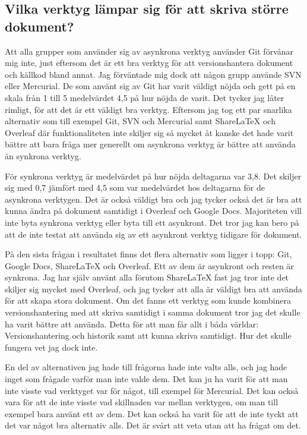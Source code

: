\subsection{Vilka verktyg lämpar sig för att skriva större dokument?}
Att alla grupper som använder sig av asynkrona verktyg använder Git förvånar mig inte, just eftersom det är ett bra verktyg för att versionshantera dokument och källkod bland annat. Jag förväntade mig dock att någon grupp använde SVN eller Mercurial. De som använt sig av Git har varit väldigt nöjda och gett på en skala från 1 till 5 medelvärdet 4,5 på hur nöjda de varit. Det tycker jag låter rimligt, för att det är ett väldigt bra verktyg. Eftersom jag tog ett par snarlika alternativ som till exempel Git, SVN och Mercurial samt ShareLaTeX och Overleaf där funktionaliteten inte skiljer sig så mycket åt kanske det hade varit bättre att bara fråga mer generellt om asynkrona verktyg är bättre att använda än synkrona verktyg.

För synkrona verktyg är medelvärdet på hur nöjda deltagarna var 3,8. Det skiljer sig med 0,7 jämfört med 4,5 som var medelvärdet hos deltagarna för de asynkrona verktygen. Det är också väldigt bra och jag tycker också det är bra att kunna ändra på dokument samtidigt i Overleaf och Google Docs. Majoriteten vill inte byta synkrona verktyg eller byta till ett asynkront. Det tror jag kan bero på att de inte testat att använda sig av ett asynkront verktyg tidigare för dokument.

På den sista frågan i resultatet finns det flera alternativ som ligger i topp: Git, Google Docs, ShareLaTeX och Overleaf. Ett av dem är asynkront och resten är synkrona. Jag har själv använt alla förutom ShareLaTeX fast jag tror inte det skiljer sig mycket med Overleaf, och jag tycker att alla är väldigt bra att använda för att skapa stora dokument. Om det fanns ett verktyg som kunde kombinera versionshantering med att skriva samtidigt i samma dokument tror jag det skulle ha varit bättre att använda. Detta för att man får allt i båda världar: Versionshantering och historik samt att kunna skriva samtidigt. Hur det skulle fungera vet jag dock inte.

En del av alternativen jag hade till frågorna hade inte valts alls, och jag hade inget som frågade varför man inte valde dem. Det kan ju ha varit för att man inte visste vad verktyget var för något, till exempel för Mercurial. Det kan också vara för att de inte visste vad skillnaden var mellan verktygen, om man till exempel bara använt ett av dem. Det kan också ha varit för att de inte tyckt att det var något bra alternativ alls. Det är svårt att veta utan att ha frågat om det. 

